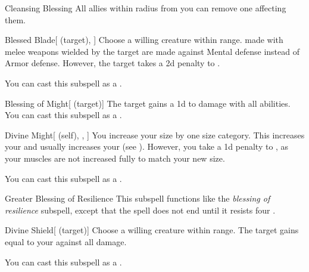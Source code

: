 \begin{ability}[\nth{1}]{Cleansing Blessing}
All allies within \arealarge radius from you can remove one  affecting them.
\end{ability}
\vspace{0.25em}


\begin{ability}[\nth{2}]{Blessed Blade}[ (target), ]
Choose a willing creature within \rngclose range.
 made with melee weapons wielded by the target are made against Mental defense instead of Armor defense.
However, the target takes a \minus2d penalty to .

You can cast this subspell as a .
\end{ability}
\vspace{0.25em}


\begin{ability}[\nth{2}]{Blessing of Might}[ (target)]
The target gains a \plus1d  to damage with all abilities.
You can cast this subspell as a .
\end{ability}
\vspace{0.25em}


\begin{ability}[\nth{3}]{Divine Might}[ (self), , ]
You increase your size by one size category.
This increases your  and usually increases your  (see ).
However, you take a \minus1d penalty to , as your muscles are not increased fully to match your new size.

You can cast this subspell as a .
\end{ability}
\vspace{0.25em}


\begin{ability}[\nth{3}]{Greater Blessing of Resilience}
This subspell functions like the \textit{blessing of resilience} subspell, except that the spell does not end until it resists four .
\end{ability}
\vspace{0.25em}


\begin{ability}[\nth{4}]{Divine Shield}[ (target)]
Choose a willing creature within \rngclose range.
The target gains  equal to your  against all damage.

You can cast this subspell as a .
\end{ability}
\vspace{0.25em}


